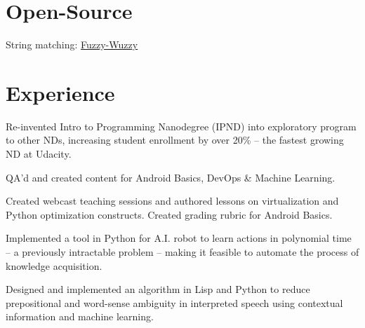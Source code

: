\documentclass[]{deedy-resume-openfont}
\begin{document}
\begin{minipage}[t]{0.31\textwidth}
\section{Open-Source}
\textbullet{} String matching: \underline{\href{https://github.com/seatgeek/fuzzywuzzy}{Fuzzy-Wuzzy}} 

%
%

\end{minipage} 
\hfill
\begin{minipage}[t]{0.66\textwidth} 


\section{Experience}

\vspace{\topsep} %
\begin{tightemize}


\item Re-invented Intro to Programming Nanodegree (IPND) into exploratory program to other NDs, increasing student enrollment by over 20\% -- the fastest growing ND at Udacity.

\item QA'd and created content for Android Basics, DevOps \& Machine Learning.

\item Created webcast teaching sessions and authored lessons on virtualization and Python optimization constructs. Created grading rubric for Android Basics.

\end{tightemize}
\sectionsep

\begin{tightemize}
\item Implemented a tool in Python for A.I. robot to learn actions in polynomial time -- a previously intractable problem -- making it feasible to automate the process of knowledge acquisition.

\item Designed and implemented an algorithm in Lisp and Python to reduce prepositional and word-sense ambiguity in interpreted speech using contextual information and machine learning.
\end{tightemize}
\sectionsep


\end{minipage}
\end{document}
